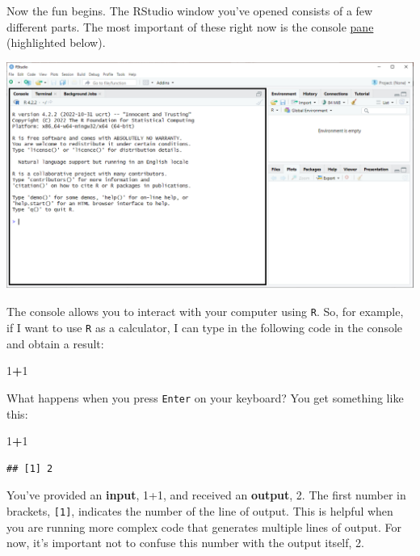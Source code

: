 \documentclass[
]{book}
\newenvironment{Shaded}{\begin{snugshade}}{\end{snugshade}}
\newcommand{\DecValTok}[1]{\textcolor[rgb]{0.00,0.00,0.81}{#1}}
\newcommand{\SpecialCharTok}[1]{\textcolor[rgb]{0.81,0.36,0.00}{\textbf{#1}}}
\begin{document}
Now the fun begins. The RStudio window you've opened consists of a few different parts. The most important of these right now is the console \href{https://docs.posit.co/ide/user/ide/guide/ui/ui-panes.html}{pane} (highlighted below).

\includegraphics{docs/_main_files/figure-html/RStudio console box.png}

The console allows you to interact with your computer using \texttt{R}. So, for example, if I want to use \texttt{R} as a calculator, I can type in the following code in the console and obtain a result:

\begin{Shaded}
\begin{Highlighting}[]
\DecValTok{1}\SpecialCharTok{+}\DecValTok{1}
\end{Highlighting}
\end{Shaded}

What happens when you press \texttt{Enter} on your keyboard? You get something like this:

\begin{Shaded}
\begin{Highlighting}[]
\DecValTok{1}\SpecialCharTok{+}\DecValTok{1}
\end{Highlighting}
\end{Shaded}

\begin{verbatim}
## [1] 2
\end{verbatim}

You've provided an \textbf{input}, 1+1, and received an \textbf{output}, 2. The first number in brackets, \texttt{{[}1{]}}, indicates the number of the line of output. This is helpful when you are running more complex code that generates multiple lines of output. For now, it's important not to confuse this number with the output itself, 2.
\end{document}
